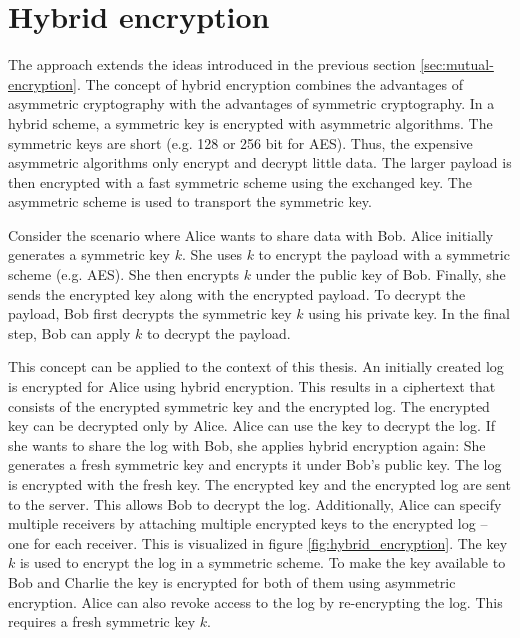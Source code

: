 \documentclass[../main.tex]{subfiles}
\begin{document}
\section{Hybrid encryption}
\label{sec:hybrid-encryption}

The approach extends the ideas introduced in the previous section \ref{sec:mutual-encryption}.
The concept of hybrid encryption combines the advantages of asymmetric cryptography with the advantages of symmetric cryptography.
In a hybrid scheme, a symmetric key is encrypted with asymmetric algorithms.
The symmetric keys are short (e.g. 128 or 256 bit for AES).
Thus, the expensive asymmetric algorithms only encrypt and decrypt little data.
The larger payload is then encrypted with a fast symmetric scheme using the exchanged key.
The asymmetric scheme is used to transport the symmetric key.~\cite[340]{Eckert2018}

Consider the scenario where Alice wants to share data with Bob.
Alice initially generates a symmetric key $k$.
She uses $k$ to encrypt the payload with a symmetric scheme (e.g. AES).
She then encrypts $k$ under the public key of Bob.
Finally, she sends the encrypted key along with the encrypted payload.
To decrypt the payload, Bob first decrypts the symmetric key $k$ using his private key.
In the final step, Bob can apply $k$ to decrypt the payload.

This concept can be applied to the context of this thesis.
An initially created log is encrypted for Alice using hybrid encryption.
This results in a ciphertext that consists of the encrypted symmetric key and the encrypted log.
The encrypted key can be decrypted only by Alice.
Alice can use the key to decrypt the log.
If she wants to share the log with Bob, she applies hybrid encryption again:
She generates a fresh symmetric key and encrypts it under Bob's public key.
The log is encrypted with the fresh key.
The encrypted key and the encrypted log are sent to the server.
This allows Bob to decrypt the log.
Additionally, Alice can specify multiple receivers by attaching multiple encrypted keys to the encrypted log -- one for each receiver.
This is visualized in figure \ref{fig:hybrid_encryption}. 
The key $k$ is used to encrypt the log in a symmetric scheme.
To make the key available to Bob and Charlie the key is encrypted for both of them using asymmetric encryption.
Alice can also revoke access to the log by re-encrypting the log. 
This requires a fresh symmetric key $k$.
\end{document}

